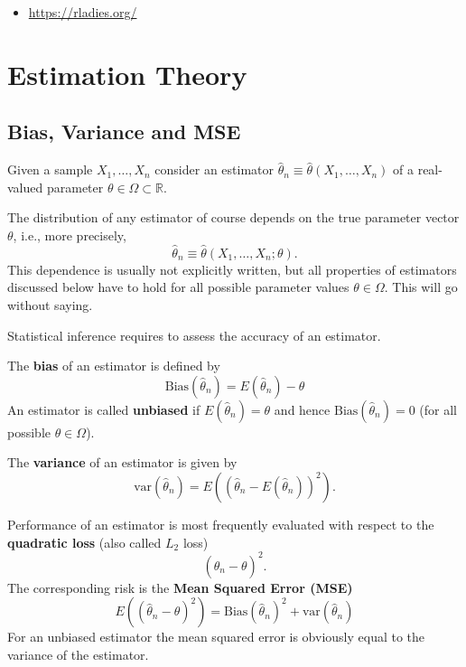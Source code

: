 \documentclass[
]{book}
\providecommand{\tightlist}{%
  \setlength{\itemsep}{0pt}\setlength{\parskip}{0pt}}
\begin{document}
\begin{itemize}
\tightlist
\item
  \url{https://rladies.org/}
\end{itemize}

\hypertarget{estimation-theory}{%
\chapter{Estimation Theory}\label{estimation-theory}}

\hypertarget{bias-variance-and-mse}{%
\section{Bias, Variance and MSE}\label{bias-variance-and-mse}}

Given a sample \(X_1,\dots,X_n\) consider an estimator \(\widehat{\theta}_n\equiv\widehat{\theta}(X_1,\dots,X_n)\) of a real-valued parameter \(\theta\in\Omega\subset\mathbb{R}\).

The distribution of any estimator of course depends on the true parameter vector \(\theta\), i.e., more precisely, \[\widehat{\theta}_n\equiv \widehat{\theta}(X_1,\dots,X_n;\theta).\]
This dependence is usually not explicitly written, but all properties of estimators discussed below have to hold for all possible parameter values \(\theta\in\Omega\). This will go without saying.

\hfill\break

Statistical inference requires to assess the accuracy of an estimator.

\hfill\break

The \textbf{bias} of an estimator is defined by
\[\textrm{Bias}(\widehat{\theta}_n)=E(\widehat{\theta}_n)-\theta\]
An estimator is called \textbf{unbiased} if \(E(\widehat{\theta}_n)=\theta\) and hence \(\textrm{Bias}(\widehat{\theta}_n)=0\) (for all possible \(\theta\in\Omega\)).

\hfill\break

The \textbf{variance} of an estimator is given by
\[\textrm{var}(\widehat{\theta}_n)=E\left((\widehat{\theta}_n-E(\widehat{\theta}_n))^2\right).\]

\hfill\break

Performance of an estimator is most frequently evaluated with respect to the \textbf{quadratic loss} (also
called \(L_2\) loss)
\[(\widehat{\theta}_n-\theta)^2.\]
The corresponding risk is the \textbf{Mean Squared Error (MSE)}
\[E\left((\widehat{\theta}_n-\theta)^2\right)=\textrm{Bias}(\widehat{\theta}_n)^2+\textrm{var}(\widehat{\theta}_n)\]
For an unbiased estimator the mean squared error is obviously equal to the variance of the estimator.
\end{document}
